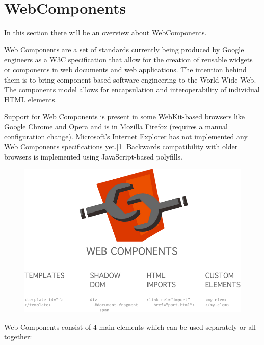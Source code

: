 \section{WebComponents}
\label{sec:TCH_webcomponents}

In this section there will be an overview about WebComponents.

Web Components are a set of standards currently being produced by Google engineers as a W3C specification that allow for the creation of reusable widgets or components in web documents and web applications. The intention behind them is to bring component-based software engineering to the World Wide Web. The components model allows for encapsulation and interoperability of individual HTML elements.

Support for Web Components is present in some WebKit-based browsers like Google Chrome and Opera and is in Mozilla Firefox (requires a manual configuration change). Microsoft's Internet Explorer has not implemented any Web Components specifications yet.[1] Backwards compatibility with older browsers is implemented using JavaScript-based polyfills.

\begin {figure}[h]
\graphicspath{{images/chapter_TCH/}}
\includegraphics[width=\textwidth]{webcomponents_1}
\end {figure}

Web Components consist of 4 main elements which can be used separately or all together:

